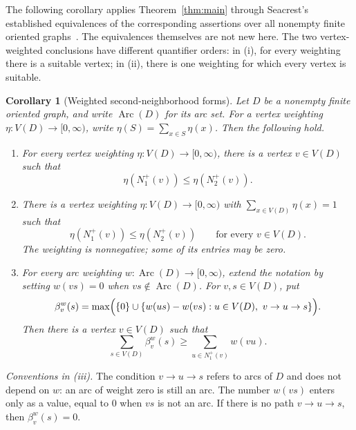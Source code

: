 \documentclass[11pt]{article}
\newtheorem{corollary}[theorem]{Corollary}
\theoremstyle{remark}
\DeclareMathOperator{\Arc}{Arc}
\begin{document}
The following corollary applies Theorem~\ref{thm:main} through Seacrest's
established equivalences of the corresponding assertions over all nonempty
finite oriented graphs~\cite{Seacrest2015}. The equivalences themselves are
not new here. The two vertex-weighted conclusions have different quantifier
orders: in (i), for every weighting there is a suitable vertex; in (ii),
there is one weighting for which every vertex is suitable.

\begin{corollary}[Weighted second-neighborhood forms]\label{cor:weighted-forms}
Let \(D\) be a nonempty finite oriented graph, and write \(\Arc(D)\) for its
arc set. For a vertex weighting \(\eta:V(D)\to[0,\infty)\), write
\(\eta(S)=\sum_{x\in S}\eta(x)\). Then the following hold.
\begin{enumerate}[label=\textup{(\roman*)}]
\item For every vertex weighting \(\eta:V(D)\to[0,\infty)\), there is a
vertex \(v\in V(D)\) such that
\[
 \eta(N_1^+(v))\leq\eta(N_2^+(v)).
\]

\item There is a vertex weighting \(\eta:V(D)\to[0,\infty)\) with
\(\sum_{x\in V(D)}\eta(x)=1\) such that
\[
 \eta(N_1^+(v))\leq\eta(N_2^+(v))\qquad\text{for every }v\in V(D).
\]
The weighting is nonnegative; some of its entries may be zero.

\item For every arc weighting \(w:\Arc(D)\to[0,\infty)\), extend the notation
by setting \(w(vs)=0\) when \(vs\notin \Arc(D)\). For \(v,s\in V(D)\), put
\[
 \beta_v^w(s)=\max\Bigl(\{0\}\cup
 \{w(us)-w(vs):u\in V(D),\ v\to u\to s\}\Bigr).
\]
Then there is a vertex \(v\in V(D)\) such that
\[
 \sum_{s\in V(D)}\beta_v^w(s)
 \geq \sum_{u\in N_1^+(v)}w(vu).
\]
\end{enumerate}
\end{corollary}

\emph{Conventions in \textup{(iii)}.} The condition $v\to u\to s$ refers to
arcs of $D$ and does not depend on $w$: an arc of weight zero is still an
arc. The number $w(vs)$ enters only as a value, equal to $0$ when $vs$ is not
an arc. If there is no path $v\to u\to s$, then $\beta_v^w(s)=0$.
\end{document}
